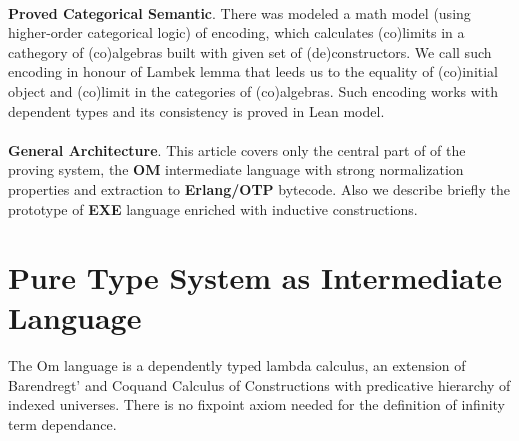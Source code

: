 \documentclass[11pt,oneside]{article}
\begin{document}
\paragraph{}
{\bf Proved Categorical Semantic}. There was modeled a math model (using
higher-order categorical logic) of encoding, which calculates (co)limits in a
cathegory of (co)algebras built with given set of (de)constructors.
We call such encoding in honour of Lambek lemma that leeds us to the
equality of (co)initial object and (co)limit in the categories of (co)algebras.
Such encoding works with dependent types and its consistency is proved in Lean model.

\paragraph{}
{\bf General Architecture}. This article covers only the central part of
of the proving system, the {\bf OM} intermediate language with strong
normalization properties and extraction to {\bf Erlang/OTP} bytecode.
Also we describe briefly the prototype of {\bf EXE} language enriched
with inductive constructions.

\begin{center}
\end{center}

\newpage
\section{Pure Type System as Intermediate Language}

   \paragraph{}
   The Om language is a dependently typed lambda calculus, an extension of Barendregt'
   and Coquand Calculus of Constructions with predicative hierarchy of indexed universes.
   There is no fixpoint axiom needed for the definition of infinity term dependance.
\end{document}
